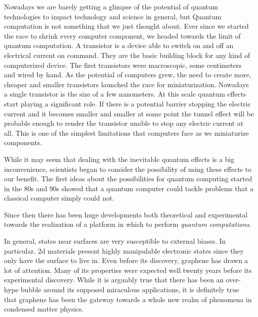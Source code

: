 Nowadays we are barely getting a glimpse of the potential of quantum technologies to impact technology and science in general, but Quantum computation is not something that we just thought about.
Ever since we started the race to shrink every computer component, we headed towards the limit of quantum computation. A transistor is a device able to switch on and off an electrical current on command. They are the basic building block for any kind of computerized device. The first transistors were macroscopic, some centimeters and wired by hand. As the potential of computers grew, the need to create more, cheaper and smaller transistors launched the race for miniaturization. %
Nowadays a single transistor is the size of a few nanometers. At this scale  quantum effects start playing a significant role.
If there is a potential barrier stopping the electric current and it becomes smaller and smaller at some point the tunnel effect will be probable enough to render the transistor unable to stop any electric current at all.
This is one of the simplest limitations that computers face as we miniaturize components.

While it may seem that dealing with the inevitable quantum effects is a big inconvenience, scientists began to consider the possibility of using these effects to our benefit.
The first ideas about the possibilities for quantum computing started in the 80s and 90s\cite{Benioff1980, Feynman1982, Manin1980, Shor1994} showed that a quantum computer could tackle problems that a classical computer simply could not.

Since then there has been huge developments both theoretical and experimental towards the realization of a platform in which to perform \emph{quantum computations}.




\medbreak


In general, states near surfaces are very susceptible to external biases. In particular, \ac{2d} materials present highly manipulable electronic states since they only have the surface to live in.
Even before its discovery, graphene has drawn a lot of attention. Many of its properties were expected well twenty years before its experimental discovery. While it is arguably true that there has been an over-hype bubble around its supposed miraculous applications, it is definitely true that graphene has been the gateway towards a whole new realm of phenomena in condensed matter physics. 

